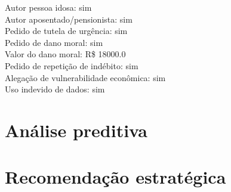 \documentclass[12pt]{article}
\begin{document}
Autor pessoa idosa: sim \\
Autor aposentado/pensionista: sim \\
Pedido de tutela de urgência: sim \\
Pedido de dano moral: sim \\
Valor do dano moral: R\$ 18000.0 \\
Pedido de repetição de indébito: sim \\
Alegação de vulnerabilidade econômica: sim \\
Uso indevido de dados: sim

\section*{Análise preditiva}


\section*{Recomendação estratégica}

\end{document}
